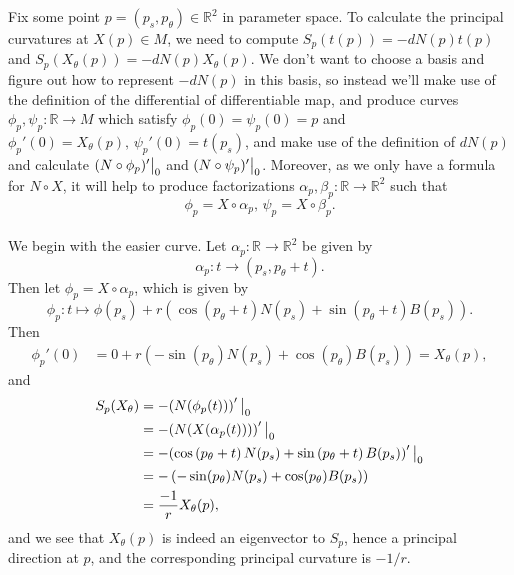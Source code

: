 \documentclass{article}
\newcommand\restr[2]{{%
  \left.\kern-\nulldelimiterspace %
  #1 %
  \vphantom{\big|} %
  \right|_{#2} %
  }}
\theoremstyle{definition}
\newcommand{\R}{\mathbb{R}}
\begin{document}
Fix some point $p = (p_s, p_\theta) \in \R^2$ in parameter space. To calculate
the principal curvatures at $X(p) \in M$, we need to compute $S_p(t(p)) =
-dN(p)t(p)$ and $S_p(X_\theta(p)) = -dN(p)X_{\theta}(p)$. We don't want to
choose a basis and figure out how to represent $-dN(p)$ in this basis, so
instead we'll make use of the definition of the differential of differentiable
map, and produce curves $\phi_p, \psi_p : \R \to M$ which satisfy $\phi_p(0) =
\psi_p(0) = p$ and $\phi_p'(0) = X_\theta(p),\, \psi_p'(0) = t(p_s)$, and make
use of the definition of $dN(p)$ and calculate $\restr{(N \circ \phi_p)'}{0}$
and $\restr{(N \circ \psi_p)'}{0}$. Moreover, as we only have a formula for $N
\circ X$, it will help to produce factorizations $\alpha_p, \beta_p : \R \to
\R^2$ such that 
\[
	\phi_p = X \circ \alpha_p, \,
	\psi_p = X \circ \beta_p.
\] \\

We begin with the easier curve. Let $\alpha_p : \R \to \R^2$ be given by 
\[
	\alpha_p : t \to \left(p_s, p_{\theta} + t\right).
\] 
Then let $\phi_p = X \circ \alpha_p$, which is given by 
\[
	\phi_p 
	: 
	t 
	\mapsto 
	\phi(p_s) 
	+ 
	r\left(
		\cos\left(p_{\theta} + t\right)N(p_s)
		+
		\sin\left(p_{\theta} + t\right)B(p_s)
	\right).
\]
Then
\begin{align*}
	\phi_p'(0) 
	&= 
	0
	+
	r
	\left(
		-\sin(p_{\theta})N(p_s)
		+
		\cos(p_{\theta})B(p_s)
	\right) 
	=
	X_{\theta}(p),
\end{align*}
and 
\begin{align*}
	S_{p}(X_{\theta})
	&=
	-
	\restr{
		\left(
			N(\phi_p(t))
		\right)'
	}{0} \\
	&=
	-
	\restr{
		\left(
			N(X(\alpha_p(t)))
		\right)'
	}{0} \\
	&=
	-
	\restr{
		\left(
			\cos\left(p_{\theta} + t \right)N(p_s)
			+
			\sin\left(p_{\theta} + t \right)B(p_s)
		\right)'
	}{0} \\
	&=
	-
	\left(
		-\sin(p_{\theta})N(p_s)
		+
		\cos(p_{\theta})B(p_s)
	\right) \\
	&=
	\frac{-1}{r} X_{\theta}(p),
\end{align*}
and we see that $X_{\theta}(p)$ is indeed an eigenvector to $S_p$, hence a
principal direction at $p$, and the corresponding principal curvature is
$-1/r$. \\
\end{document}
